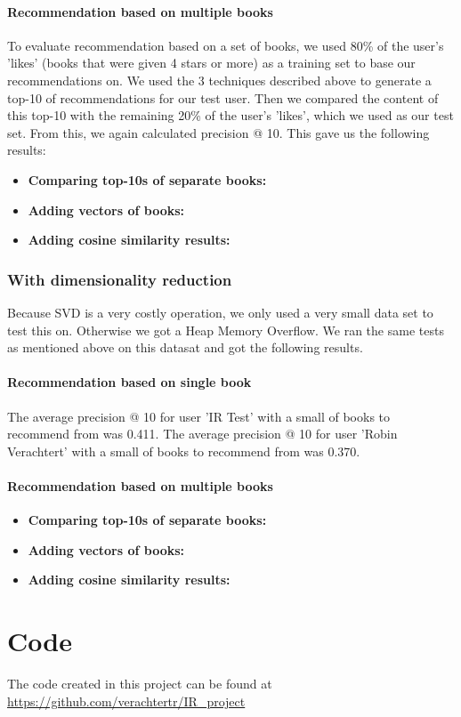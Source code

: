 \documentclass[10pt,a4paper]{paper}
\begin{document}
\paragraph{Recommendation based on multiple books}
To evaluate recommendation based on a set of books, we used 80\% of the user's 'likes' (books that were given 4 stars or more) as a training set to base our recommendations on. We used the 3 techniques described above to generate a top-10 of recommendations for our test user. Then we compared the content of this top-10 with the remaining 20\% of the user's 'likes', which we used as our test set.
From this, we again calculated precision @ 10.
This gave us the following results:
\begin{itemize}
\item \textbf{Comparing top-10s of separate books:} %
\item \textbf{Adding vectors of books:}
\item \textbf{Adding cosine similarity results:}
\end{itemize}

\subsubsection{With dimensionality reduction}
Because SVD is a very costly operation, we only used a very small data set to test this on. Otherwise we got a Heap Memory Overflow.
We ran the same tests as mentioned above on this datasat and got the following results.

\paragraph{Recommendation based on single book}

The average precision @ 10 for user 'IR Test' with a small of books to recommend from was 0.411.
The average precision @ 10 for user 'Robin Verachtert' with a small of books to recommend from was 0.370.

\paragraph{Recommendation based on multiple books}

\begin{itemize}
\item \textbf{Comparing top-10s of separate books:} %
\item \textbf{Adding vectors of books:}
\item \textbf{Adding cosine similarity results:}
\end{itemize}

\section{Code}
The code created in this project can be found at \url{https://github.com/verachtertr/IR_project}
\end{document}
